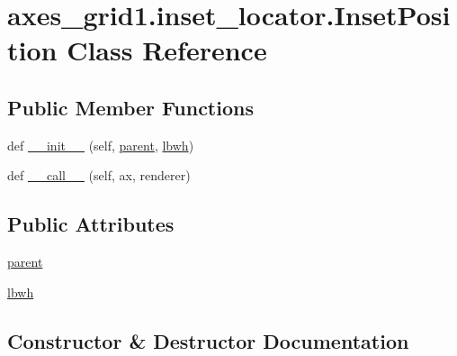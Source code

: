 \hypertarget{classaxes__grid1_1_1inset__locator_1_1InsetPosition}{}\section{axes\+\_\+grid1.\+inset\+\_\+locator.\+Inset\+Position Class Reference}
\label{classaxes__grid1_1_1inset__locator_1_1InsetPosition}
\subsection*{Public Member Functions}
\begin{DoxyCompactItemize}
\item 
def \hyperlink{classaxes__grid1_1_1inset__locator_1_1InsetPosition_a74f9a23ca6af05f4621c6c2473504781}{\+\_\+\+\_\+init\+\_\+\+\_\+} (self, \hyperlink{classaxes__grid1_1_1inset__locator_1_1InsetPosition_ac716d6053265d680f44093eca188020e}{parent}, \hyperlink{classaxes__grid1_1_1inset__locator_1_1InsetPosition_a2ff82aecea2a7e685c5dc00cda9fe089}{lbwh})
\item 
def \hyperlink{classaxes__grid1_1_1inset__locator_1_1InsetPosition_a442ce8d8df64d55c0a939fcf52db759f}{\+\_\+\+\_\+call\+\_\+\+\_\+} (self, ax, renderer)
\end{DoxyCompactItemize}
\subsection*{Public Attributes}
\begin{DoxyCompactItemize}
\item 
\hyperlink{classaxes__grid1_1_1inset__locator_1_1InsetPosition_ac716d6053265d680f44093eca188020e}{parent}
\item 
\hyperlink{classaxes__grid1_1_1inset__locator_1_1InsetPosition_a2ff82aecea2a7e685c5dc00cda9fe089}{lbwh}
\end{DoxyCompactItemize}


\subsection{Constructor \& Destructor Documentation}
\mbox{\label{classaxes__grid1_1_1inset__locator_1_1InsetPosition_a74f9a23ca6af05f4621c6c2473504781}} 
